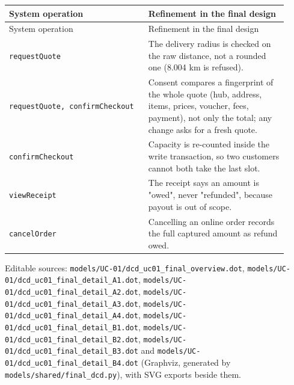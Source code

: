 \begin{longtable}{>{\raggedright\arraybackslash}p{0.4600\linewidth}>{\raggedright\arraybackslash}p{0.4600\linewidth}}
System operation & Refinement in the final design \\
\hline\endfirsthead
System operation & Refinement in the final design \\
\hline\endhead
\texttt{requestQuote} & The delivery radius is checked on the raw distance, not a rounded one (8.004 km is refused). \\
\texttt{requestQuote, confirmCheckout} & Consent compares a fingerprint of the whole quote (hub, address, items, prices, voucher, fees, payment), not only the total; any change asks for a fresh quote. \\
\texttt{confirmCheckout} & Capacity is re-counted inside the write transaction, so two customers cannot both take the last slot. \\
\texttt{viewReceipt} & The receipt says an amount is "owed", never "refunded", because payout is out of scope. \\
\texttt{cancelOrder} & Cancelling an online order records the full captured amount as refund owed. \\
\end{longtable}
Editable sources: \texttt{models/\allowbreak{}UC-01/\allowbreak{}dcd\_\allowbreak{}uc01\_\allowbreak{}final\_\allowbreak{}overview.\allowbreak{}dot}, \texttt{models/\allowbreak{}UC-01/\allowbreak{}dcd\_\allowbreak{}uc01\_\allowbreak{}final\_\allowbreak{}detail\_\allowbreak{}A1.\allowbreak{}dot}, \texttt{models/\allowbreak{}UC-01/\allowbreak{}dcd\_\allowbreak{}uc01\_\allowbreak{}final\_\allowbreak{}detail\_\allowbreak{}A2.\allowbreak{}dot}, \texttt{models/\allowbreak{}UC-01/\allowbreak{}dcd\_\allowbreak{}uc01\_\allowbreak{}final\_\allowbreak{}detail\_\allowbreak{}A3.\allowbreak{}dot}, \texttt{models/\allowbreak{}UC-01/\allowbreak{}dcd\_\allowbreak{}uc01\_\allowbreak{}final\_\allowbreak{}detail\_\allowbreak{}A4.\allowbreak{}dot}, \texttt{models/\allowbreak{}UC-01/\allowbreak{}dcd\_\allowbreak{}uc01\_\allowbreak{}final\_\allowbreak{}detail\_\allowbreak{}B1.\allowbreak{}dot}, \texttt{models/\allowbreak{}UC-01/\allowbreak{}dcd\_\allowbreak{}uc01\_\allowbreak{}final\_\allowbreak{}detail\_\allowbreak{}B2.\allowbreak{}dot}, \texttt{models/\allowbreak{}UC-01/\allowbreak{}dcd\_\allowbreak{}uc01\_\allowbreak{}final\_\allowbreak{}detail\_\allowbreak{}B3.\allowbreak{}dot} and \texttt{models/\allowbreak{}UC-01/\allowbreak{}dcd\_\allowbreak{}uc01\_\allowbreak{}final\_\allowbreak{}detail\_\allowbreak{}B4.\allowbreak{}dot} (Graphviz, generated by \texttt{models/\allowbreak{}shared/\allowbreak{}final\_\allowbreak{}dcd.\allowbreak{}py}), with SVG exports beside them.
